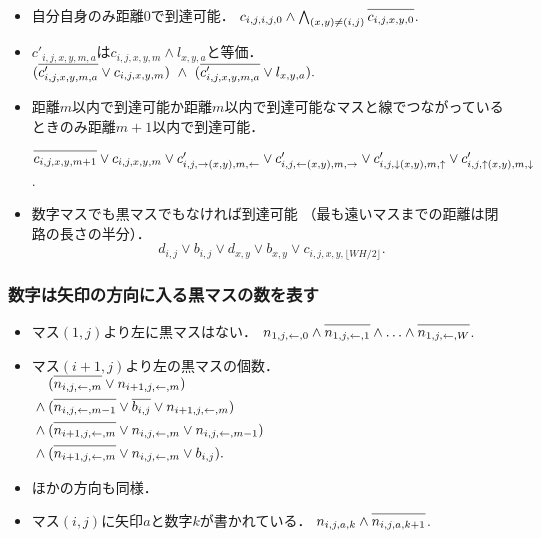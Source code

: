 \documentclass[a4j]{jarticle}
\newcommand{\N}[1]{\overline{#1\vphantom{l}}}
\newcommand{\←}{{\leftarrow}}
\newcommand{\→}{{\rightarrow}}
\newcommand{\↑}{{\uparrow}}
\newcommand{\↓}{{\downarrow}}
\begin{document}
\begin{itemize}
\item 自分自身のみ距離0で到達可能．\quad
  $c_{i,j,i,j,0}\land \bigwedge_{(x,y)\ne(i,j)} \N{c_{i,j,x,y,0}}$.

\item $c'_{i,j,x,y,m,a}$は$c_{i,j,x,y,m}\land l_{x,y,a}$と等価．
  \quad
  $
   (\N{c'_{i,j,x,y,m,a}}\lor{c_{i,j,x,y,m}})\ {}\land{}\
   (\N{c'_{i,j,x,y,m,a}}\lor{l_{x,y,a}}).
   $

\item 距離$m$以内で到達可能か距離$m$以内で到達可能なマスと線でつながっている
  ときのみ距離$m+1$以内で到達可能．
   \par\qquad
     $\N{c_{i,j,x,y,m+1}}\lor
      c_{i,j,x,y,m}\lor
      c'_{i,j,\→(x,y),m,\←}\lor
      c'_{i,j,\←(x,y),m,\→}\lor
      c'_{i,j,\↓(x,y),m,\↑}\lor
      c'_{i,j,\↑(x,y),m,\↓}$.

\item 数字マスでも黒マスでもなければ到達可能
  （最も遠いマスまでの距離は閉路の長さの半分）．
  \begin{equation}
   d_{i,j}\lor b_{i,j}\lor
   d_{x,y}\lor b_{x,y}\lor
   c_{i,j,x,y,\lfloor WH/2\rfloor}.
   \label{eq:reachability}
  \end{equation}
\end{itemize}

\subsubsection{数字は矢印の方向に入る黒マスの数を表す}

\begin{itemize}
\item マス$(1,j)$より左に黒マスはない．\quad
$n_{1,j,\←,0}
\land \N{n_{1,j,\←,1}} \land\ldots\land \N{n_{1,j,\←,W}}$.

\item マス$(i+1,j)$より左の黒マスの個数．
  $\begin{aligned}[t]
   &(\N{n_{i,j,\←,m}}\lor n_{i+1,j,\←,m})\\{}\land{}
   &(\N{n_{i,j,\←,m-1}}\lor\N{b_{i,j}}\lor n_{i+1,j,\←,m})\\{}\land{}
   &(\N{n_{i+1,j,\←,m}}\lor n_{i,j,\←,m}\lor n_{i,j,\←,m-1})\\
   {}\land{}
   &(\N{n_{i+1,j,\←,m}}\lor n_{i,j,\←,m}\lor b_{i,j}).
   \end{aligned}$

\item ほかの方向も同様．

\item マス$(i,j)$に矢印$a$と数字$k$が書かれている．
  $n_{i,j,a,k}\land\N{n_{i,j,a,k+1}}$.
\end{itemize}
\end{document}
